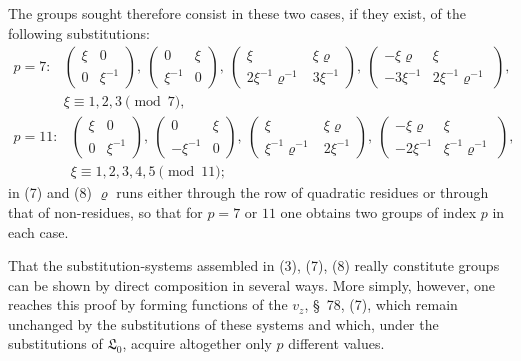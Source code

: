 \documentclass[11pt]{article}
\providecommand{\Lzero}{\mathfrak L_0}
\begin{document}
The groups sought therefore consist in these two cases, if they exist, of the following substitutions:
\[
\begin{array}{ll}
p=7:&
\begin{pmatrix}\xi&0\\0&\xi^{-1}\end{pmatrix},\
\begin{pmatrix}0&\xi\\ \xi^{-1}&0\end{pmatrix},\
\begin{pmatrix}\xi&\xi\varrho\\2\xi^{-1}\varrho^{-1}&3\xi^{-1}\end{pmatrix},\
\begin{pmatrix}-\xi\varrho&\xi\\-3\xi^{-1}&2\xi^{-1}\varrho^{-1}\end{pmatrix},\\
&\xi\equiv1,2,3\pmod7,
\end{array}
\tag{7}
\]
\[
\begin{array}{ll}
p=11:&
\begin{pmatrix}\xi&0\\0&\xi^{-1}\end{pmatrix},\
\begin{pmatrix}0&\xi\\-\xi^{-1}&0\end{pmatrix},\
\begin{pmatrix}\xi&\xi\varrho\\\xi^{-1}\varrho^{-1}&2\xi^{-1}\end{pmatrix},\
\begin{pmatrix}-\xi\varrho&\xi\\-2\xi^{-1}&\xi^{-1}\varrho^{-1}\end{pmatrix},\\
&\xi\equiv1,2,3,4,5\pmod {11};
\end{array}
\tag{8}
\]
in (7) and (8) $\varrho$ runs either through the row of quadratic residues or through that of non-residues, so that for $p=7$ or $11$ one obtains two groups of index $p$ in each case.

That the substitution-systems assembled in (3), (7), (8) really constitute groups can be shown by direct composition in several ways. More simply, however, one reaches this proof by forming functions of the $v_z$, \S~78, (7), which remain unchanged by the substitutions of these systems and which, under the substitutions of $\Lzero$, acquire altogether only $p$ different values.
\end{document}
